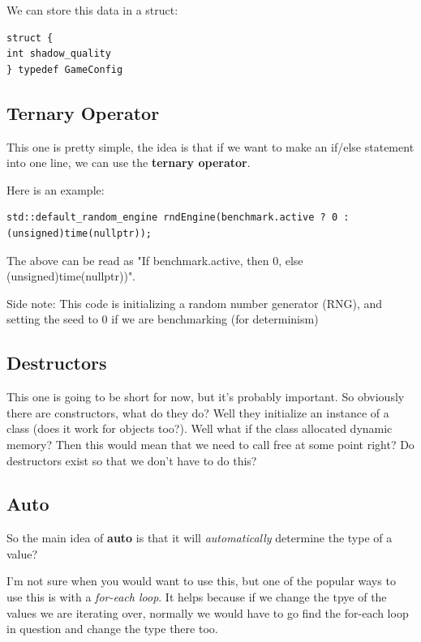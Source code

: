 \documentclass{article}
\begin{document}
\par We can store this data in a struct:
\begin{verbatim}
struct {
int shadow_quality
} typedef GameConfig
\end{verbatim}

\subsection*{Ternary
Operator}
\par This one is pretty simple, the idea is that if we want to make
an if/else statement into one line, we can use the \textbf{ternary
operator}.

\par Here is an example:
\begin{verbatim}
std::default_random_engine rndEngine(benchmark.active ? 0 : (unsigned)time(nullptr));
\end{verbatim}

\par The above can be read as "If benchmark.active, then 0, else
(unsigned)time(nullptr))".

\par Side note: This code is initializing a random number generator
(RNG), and setting the seed to 0 if we are benchmarking (for determinism)

\subsection*{Destructors}
\par This one is going to be short for now, but it's probably
important. So obviously there are constructors, what do they do? Well
they initialize an instance of a class (does it work for objects
too?). Well what if the class allocated dynamic memory? Then this
would mean that we need to call free at some point right? Do
destructors exist so that we don't have to do this?

\subsection*{Auto}
\par So the main idea of \textbf{auto} is that it will
\textit{automatically} determine the type of a value?

\par I'm not sure when you would want to use this, but one of the
popular ways to use this is with a \textit{for-each loop}. It helps
because if we change the tpye of the values we are iterating over,
normally we would have to go find the for-each loop in question and
change the type there too.
\end{document}
